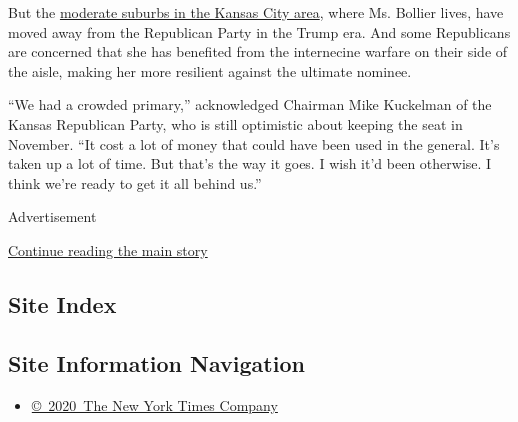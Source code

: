 But the
\href{https://www.nytimes3xbfgragh.onion/2020/05/30/us/politics/kansas-senate-kobach.html}{moderate
suburbs in the Kansas City area}, where Ms. Bollier lives, have moved
away from the Republican Party in the Trump era. And some Republicans
are concerned that she has benefited from the internecine warfare on
their side of the aisle, making her more resilient against the ultimate
nominee.

``We had a crowded primary,'' acknowledged Chairman Mike Kuckelman of
the Kansas Republican Party, who is still optimistic about keeping the
seat in November. ``It cost a lot of money that could have been used in
the general. It's taken up a lot of time. But that's the way it goes. I
wish it'd been otherwise. I think we're ready to get it all behind us.''

Advertisement

\protect\hyperlink{after-bottom}{Continue reading the main story}

\hypertarget{site-index}{%
\subsection{Site Index}\label{site-index}}

\hypertarget{site-information-navigation}{%
\subsection{Site Information
Navigation}\label{site-information-navigation}}

\begin{itemize}
\tightlist
\item
  \href{https://help.nytimes3xbfgragh.onion/hc/en-us/articles/115014792127-Copyright-notice}{©~2020~The
  New York Times Company}
\end{itemize}

